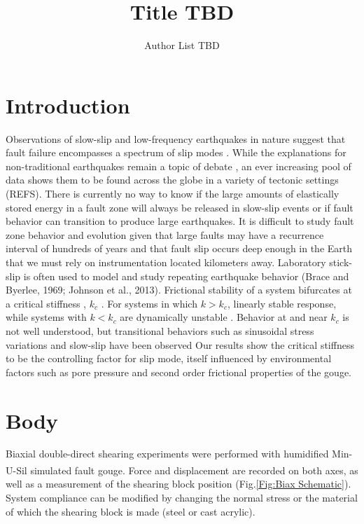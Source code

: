 \documentclass[11pt]{article}
\title{Title TBD}
\author{Author List TBD}
\begin{document}
\maketitle

\section{Introduction}
Observations of slow-slip and low-frequency earthquakes in nature suggest that
fault failure encompasses a spectrum of slip modes \cite{Peng:2010, Obara:2002, Ide 2007, Beroza:2011}. While the explanations for
non-traditional earthquakes remain a topic of debate \cite{Kaproth:2013},
an ever increasing pool of data shows them to be found across the globe in a
variety of tectonic settings (REFS). There is currently no way to know if the
large amounts of elastically stored energy in a fault zone will always be
released in slow-slip events or if fault behavior can transition to produce
large earthquakes. It is difficult to study fault zone behavior and evolution
given that large faults may have a recurrence interval of hundreds of years and
that fault slip occurs deep enough in the Earth that we must rely on
instrumentation located kilometers away. Laboratory stick-slip is often used to
model and study repeating earthquake behavior (Brace and Byerlee, 1969; Johnson
et al., 2013). Frictional stability of a system bifurcates at a critical
stiffness , $k_c$ \cite{Gu:1984}. For systems in which
$k>k_c$, linearly stable response, while systems with $k<k_c$ are dynamically
unstable \cite{Scholz:2002}. Behavior at and near $k_c$ is not well understood, but
transitional behaviors such as sinusoidal stress variations and slow-slip have
been observed \cite{Kaproth:2013, Baumberger:1994, Leeman:2015}
Our results show the critical stiffness to be the controlling factor
for slip mode, itself influenced by environmental factors such as pore pressure
and second order frictional properties of the gouge.  

\section{Body}
Biaxial double-direct shearing experiments were performed with humidified
Min-U-Sil\textsuperscript{\textregistered} simulated fault gouge. Force and displacement are recorded on both
axes, as well as a measurement of the shearing block position
(Fig.\ref{Fig:Biax Schematic}). System compliance can be modified by changing
the normal stress or the material of which the shearing block is made (steel
or cast acrylic).  
\end{document}
